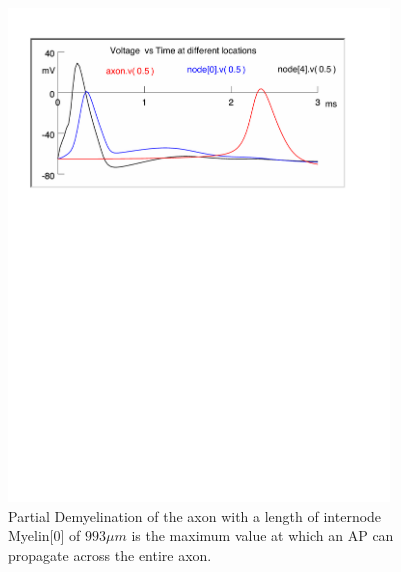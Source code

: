 \documentclass[12pt]{article}
\begin{document}
\begin{figure}[H]
\centering
\includegraphics[width=0.9\textwidth]{Results/4c-993}
\caption{\label{fig:P4c1} Partial Demyelination of the axon with a length of internode Myelin[0] of $993 \mu m$ is the maximum value at which an AP can propagate across the entire axon.}
\end{figure}
\end{document}
